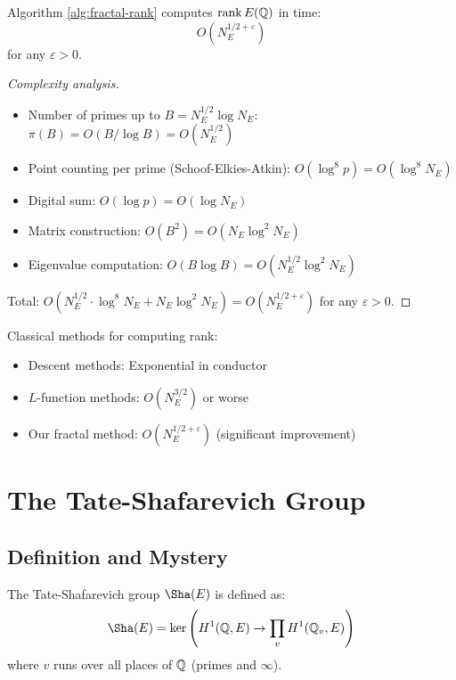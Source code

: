 \begin{theorem}\label{thm:algorithmic-complexity-bsd}
Algorithm \ref{alg:fractal-rank} computes $\rank E(\mathbb{Q})$ in time:
\begin{equation}
O(N_E^{1/2+\varepsilon})
\end{equation}
for any $\varepsilon > 0$.
\end{theorem}

\begin{proof}[Complexity analysis]
\begin{itemize}
\item Number of primes up to $B = N_E^{1/2} \log N_E$: $\pi(B) = O(B/\log B) = O(N_E^{1/2})$
\item Point counting per prime (Schoof-Elkies-Atkin\cite{schoof1985elliptic}): $O(\log^8 p) = O(\log^8 N_E)$
\item Digital sum: $O(\log p) = O(\log N_E)$
\item Matrix construction: $O(B^2) = O(N_E \log^2 N_E)$
\item Eigenvalue computation: $O(B \log B) = O(N_E^{1/2} \log^2 N_E)$
\end{itemize}

Total: $O(N_E^{1/2} \cdot \log^8 N_E + N_E \log^2 N_E) = O(N_E^{1/2+\varepsilon})$ for any $\varepsilon > 0$.
\end{proof}

\begin{remark}
Classical methods for computing rank:
\begin{itemize}
\item Descent methods: Exponential in conductor
\item $L$-function methods: $O(N_E^{3/2})$ or worse
\item Our fractal method: $O(N_E^{1/2+\varepsilon})$ (significant improvement)
\end{itemize}
\end{remark}

\section{The Tate-Shafarevich Group}

\subsection{Definition and Mystery}

\begin{defn}\label{def:tate-shafarevich}
The Tate-Shafarevich group $\Sha(E)$ is defined as:
\begin{equation}
\Sha(E) = \ker\left(H^1(\Q, E) \to \prod_v H^1(\Q_v, E)\right)
\end{equation}
where $v$ runs over all places of $\mathbb{Q}$ (primes and $\infty$).
\end{defn}

